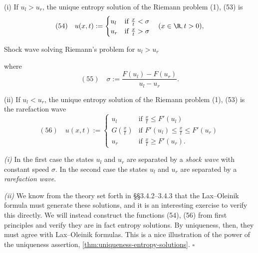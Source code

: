 \begin{theorem}
\label{thm:riemann-problem-solution}
(i) If $u_l > u_r$, the unique entropy solution of the Riemann problem (1), (53) is
$$(54) \quad u(x,t) := \begin{cases} u_l & \text{if } \frac{x}{t} < \sigma \\ u_r & \text{if } \frac{x}{t} > \sigma \end{cases} \quad (x \in \R, t > 0),$$

\begin{figure}[h]\centering
\end{figure}

Shock wave solving Riemann's problem for $u_l > u_r$

where
$$(55) \quad \sigma := \frac{F(u_l) - F(u_r)}{u_l - u_r}.$$

(ii) If $u_l < u_r$, the unique entropy solution of the Riemann problem (1), (53) is the rarefaction wave
$$(56) \quad u(x,t) := \begin{cases} u_l & \text{if } \frac{x}{t} \leq F'(u_l) \\ G\left(\frac{x}{t}\right) & \text{if } F'(u_l) \leq \frac{x}{t} \leq F'(u_r) \\ u_r & \text{if } \frac{x}{t} \geq F'(u_r). \end{cases}$$
\end{theorem}

\begin{remark}
\label{rem:riemann-problem-shock-vs-rarefaction}
\textit{(i)} In the first case the states $u_l$ and $u_r$ are separated by a \textit{shock wave} with constant speed $\sigma$. In the second case the states $u_l$ and $u_r$ are separated by a \textit{rarefaction wave}.

\textit{(ii)} We know from the theory set forth in \S\S 3.4.2--3.4.3 that the Lax--Oleinik formula must generate these solutions, and it is an interesting exercise to verify this directly. We will instead construct the functions (54), (56) from first principles and verify they are in fact entropy solutions. By uniqueness, then, they must agree with Lax--Oleinik formulas. This is a nice illustration of the power of the uniqueness assertion, \cref{thm:uniqueness-entropy-solutions}. $\square$
\end{remark}

